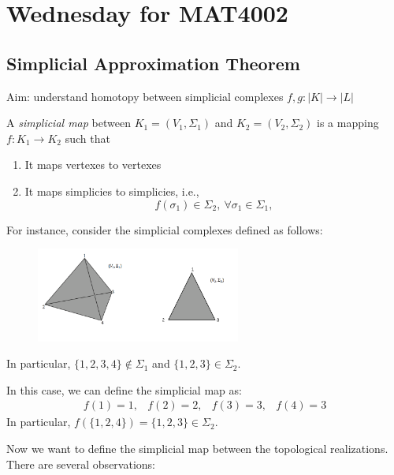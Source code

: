\section{Wednesday for MAT4002}
\subsection{Simplicial Approximation Theorem}
Aim: understand homotopy between simplicial complexes $f,g:|K|\to|L|$

\begin{definition}
A \emph{simplicial map} between 
$K_1=(V_1,\Sigma_1)$ and $K_2=(V_2,\Sigma_2)$ is a mapping $f:K_1\to K_2$ 
such that 
\begin{enumerate}
\item
It maps vertexes to vertexes
\item
It maps simplicies to simplicies, i.e., 
\[
f(\sigma_1)\in\Sigma_2,\ \forall\sigma_1\in\Sigma_1,
\]
\end{enumerate}
\end{definition}
\begin{example}
For instance, consider the simplicial complexes defined as follows:
\begin{figure}[H]
\centering
\includegraphics[width=0.6\textwidth]{week9/p_5}
\end{figure} 
In particular, $\{1,2,3,4\}\notin\Sigma_1$ and $\{1,2,3\}\in\Sigma_2$.

In this case, we can define the simplicial map as:
\[
\begin{array}{llll}
f(1)=1,&f(2)=2,&f(3)=3,&f(4)=3
\end{array}
\]
In particular, $f(\{1,2,4\})=\{1,2,3\}\in\Sigma_2$.
\end{example}

Now we want to define the simplicial map between the topological realizations. There are several observations:
